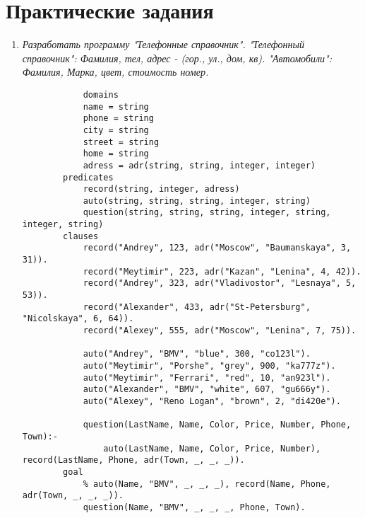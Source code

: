 
\chapter{Практические задания}

\begin{enumerate}[wide=0pt]

	\item \textit{Разработать программу "Телефонные справочник".
	"Телефонный справочник": Фамилия, тел, адрес - (гор., ул., дом, кв).
	"Автомобили": Фамилия, Марка, цвет, стоимость номер.}

		\begin{lstlisting}
			domains
			name = string
			phone = string
			city = string	
			street = string
			home = string
			adress = adr(string, string, integer, integer)
		predicates
			record(string, integer, adress)
			auto(string, string, string, integer, string)
			question(string, string, string, integer, string, integer, string)
		clauses
			record("Andrey", 123, adr("Moscow", "Baumanskaya", 3, 31)).
			record("Meytimir", 223, adr("Kazan", "Lenina", 4, 42)).
			record("Andrey", 323, adr("Vladivostor", "Lesnaya", 5, 53)).
			record("Alexander", 433, adr("St-Petersburg", "Nicolskaya", 6, 64)).
			record("Alexey", 555, adr("Moscow", "Lenina", 7, 75)).
		
			auto("Andrey", "BMV", "blue", 300, "co123l").
			auto("Meytimir", "Porshe", "grey", 900, "ka777z").
			auto("Meytimir", "Ferrari", "red", 10, "an923l").
			auto("Alexander", "BMV", "white", 607, "gu666y").
			auto("Alexey", "Reno Logan", "brown", 2, "di420e").
	
			question(LastName, Name, Color, Price, Number, Phone, Town):-
				auto(LastName, Name, Color, Price, Number), record(LastName, Phone, adr(Town, _, _, _)).
		goal
			% auto(Name, "BMV", _, _, _), record(Name, Phone, adr(Town, _, _, _)).
			question(Name, "BMV", _, _, _, Phone, Town).		
		\end{lstlisting}
\end{enumerate}
